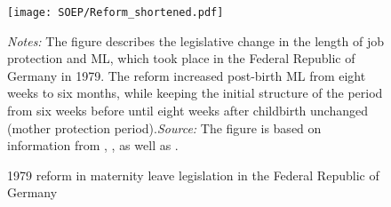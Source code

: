 

\begin{figure}[H]\centering
	\caption{1979 reform in maternity leave legislation in the Federal Republic of Germany}\label{fig_mlch: MLreform}
	\texttt{[image: SOEP/Reform\_shortened.pdf]}
	\begin{minipage}{\linewidth}
		\scriptsize{\emph{Notes:} The figure describes the legislative change in the length of job protection and ML, which took place in the Federal Republic of Germany in 1979. The reform increased post-birth ML from eight weeks to six months, while keeping the initial structure of the period from six weeks before until eight weeks after childbirth unchanged (mother protection period).\newline \textit{Source: }The figure is based on information from \cite{Dustmann2012}, \cite{DIW2002}, \cite{schonberg2014expansions} as well as \cite{zmarzlik1999mutterschutzgesetz}.}
	\end{minipage}
\end{figure}
